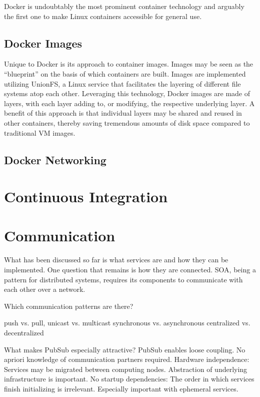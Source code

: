 Docker \cite{DockerWebsite} is undoubtably the most prominent container technology and arguably the first one to make Linux containers accessible for general use. 

\subsection{Docker Images}
Unique to Docker is its approach to container images. Images may be seen as the ``blueprint'' on the basis of which containers are built. 
Images are implemented utilizing UnionFS, a Linux service that facilitates the layering of different file systems atop each other. 
Leveraging this technology, Docker images are made of layers, with each layer adding to, or modifying, the respective underlying layer. 
A benefit of this approach is that individual layers may be shared and reused in other containers, thereby saving tremendous amounts of disk space compared to traditional VM images.

\subsection{Docker Networking}

\section{Continuous Integration}



\section{Communication}

What has been discussed so far is what services are and how they can be implemented. One question that remains is how they are connected. SOA, being a pattern for distributed systems, requires its components to communicate with each other over a network.

Which communication patterns are there?

push vs. pull,
unicast vs. multicast
synchronous vs. asynchronous
centralized vs. decentralized

What makes PubSub especially attractive?
PubSub enables loose coupling. No apriori knowledge of communication partners required. Hardware independence: Services may be migrated between computing nodes. Abstraction of underlying infrastructure is important.
No startup dependencies: The order in which services finish initializing is irrelevant. Especially important with ephemeral services.


